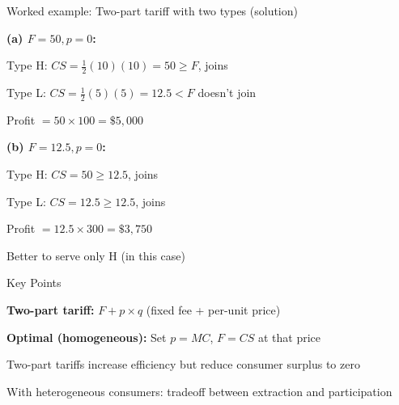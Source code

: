 \documentclass[notes,11pt, aspectratio=169]{beamer}
\newenvironment{wideitemize}{\itemize\addtolength{\itemsep}{10pt}}{\enditemize}
\newenvironment{wideenumerate}{\enumerate\addtolength{\itemsep}{10pt}}{\endenumerate}
\begin{document}
\begin{frame}{Worked example: Two-part tariff with two types (solution)}
	\begin{wideitemize}
		\item \textbf{(a) $F = 50, p = 0$:}
		\begin{wideitemize}
			\vspace{3pt}
			\item Type H: $CS = \frac{1}{2}(10)(10) = 50 \geq F$, joins
			\item Type L: $CS = \frac{1}{2}(5)(5) = 12.5 < F$ doesn't join
			\item Profit $= 50 \times 100 = \$5,000$
		\end{wideitemize}
		\item \textbf{(b) $F = 12.5, p = 0$:}
		\begin{wideitemize}
			\vspace{3pt}
			\item Type H: $CS = 50 \geq 12.5$, joins
			\item Type L: $CS = 12.5 \geq 12.5$, joins
			\item Profit $= 12.5 \times 300 = \$3,750$
		\end{wideitemize}
		\item Better to serve only H (in this case)
	\end{wideitemize}
\end{frame}


\begin{frame}{Key Points}
	\vspace{11pt}
	\begin{wideenumerate}
		\item \textbf{Two-part tariff:} $F + p \times q$ (fixed fee + per-unit price)
		\item \textbf{Optimal (homogeneous):} Set $p = MC$, $F = CS$ at that price
		\item Two-part tariffs increase efficiency but reduce consumer surplus to zero
		\item With heterogeneous consumers: tradeoff between extraction and participation
	\end{wideenumerate}
\end{frame}
\end{document}
